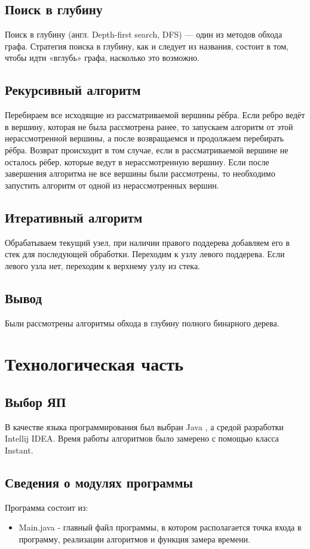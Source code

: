 \documentclass[12pt]{report}
\begin{document}
\section{Поиск в глубину}
Поиск в глубину (англ. Depth-first search, DFS) — один из методов обхода графа. Стратегия поиска в глубину, как и следует из названия, состоит в том, чтобы идти «вглубь» графа, насколько это возможно.

\section{Рекурсивный алгоритм}
Перебираем все исходящие из рассматриваемой вершины рёбра. Если ребро ведёт в вершину, которая не была рассмотрена ранее, то запускаем алгоритм от этой нерассмотренной вершины, а после возвращаемся и продолжаем перебирать рёбра. Возврат происходит в том случае, если в рассматриваемой вершине не осталось рёбер, которые ведут в нерассмотренную вершину. Если после завершения алгоритма не все вершины были рассмотрены, то необходимо запустить алгоритм от одной из нерассмотренных вершин.

\section{Итеративный алгоритм}
Обрабатываем текущий узел, при наличии правого поддерева добавляем его в стек для последующей обработки. Переходим к узлу левого поддерева. Если левого узла нет, переходим к верхнему узлу из стека.

\section{Вывод}
Были рассмотрены алгоритмы обхода в глубину полного бинарного дерева.


\chapter{Технологическая часть}
\section{Выбор ЯП}
В качестве языка программирования был выбран Java \cite{Oracle}, а средой разработки Intellij IDEA. 
Время работы алгоритмов было замерено с помощью класса Instant.


\section{Сведения о модулях программы}
Программа состоит из:
\begin{itemize}
	\item Main.java - главный файл программы, в котором располагается точка входа в программу, реализации алгоритмов и функция замера времени.
\end{itemize}
\end{document}
